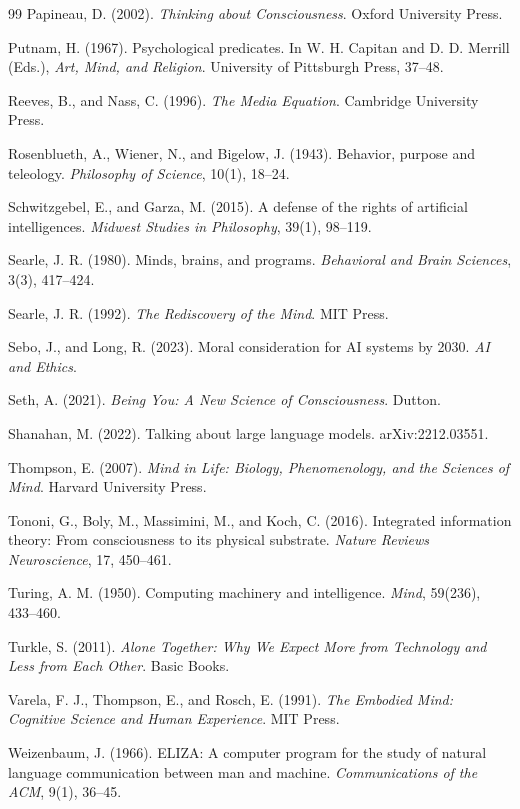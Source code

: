 \documentclass[12pt]{article}
\theoremstyle{definition}
\begin{document}
\begin{thebibliography}{99}
 Papineau, D. (2002). \emph{Thinking about Consciousness}. Oxford University Press.

 Putnam, H. (1967). Psychological predicates. In W. H. Capitan and D. D. Merrill (Eds.), \emph{Art, Mind, and Religion}. University of Pittsburgh Press, 37--48.

 Reeves, B., and Nass, C. (1996). \emph{The Media Equation}. Cambridge University Press.

 Rosenblueth, A., Wiener, N., and Bigelow, J. (1943). Behavior, purpose and teleology. \emph{Philosophy of Science}, 10(1), 18--24.

 Schwitzgebel, E., and Garza, M. (2015). A defense of the rights of artificial intelligences. \emph{Midwest Studies in Philosophy}, 39(1), 98--119.

 Searle, J. R. (1980). Minds, brains, and programs. \emph{Behavioral and Brain Sciences}, 3(3), 417--424.

 Searle, J. R. (1992). \emph{The Rediscovery of the Mind}. MIT Press.

 Sebo, J., and Long, R. (2023). Moral consideration for AI systems by 2030. \emph{AI and Ethics}.

 Seth, A. (2021). \emph{Being You: A New Science of Consciousness}. Dutton.

 Shanahan, M. (2022). Talking about large language models. arXiv:2212.03551.

 Thompson, E. (2007). \emph{Mind in Life: Biology, Phenomenology, and the Sciences of Mind}. Harvard University Press.

 Tononi, G., Boly, M., Massimini, M., and Koch, C. (2016). Integrated information theory: From consciousness to its physical substrate. \emph{Nature Reviews Neuroscience}, 17, 450--461.

 Turing, A. M. (1950). Computing machinery and intelligence. \emph{Mind}, 59(236), 433--460.

 Turkle, S. (2011). \emph{Alone Together: Why We Expect More from Technology and Less from Each Other}. Basic Books.

 Varela, F. J., Thompson, E., and Rosch, E. (1991). \emph{The Embodied Mind: Cognitive Science and Human Experience}. MIT Press.

 Weizenbaum, J. (1966). ELIZA: A computer program for the study of natural language communication between man and machine. \emph{Communications of the ACM}, 9(1), 36--45.

\end{thebibliography}
\end{document}
